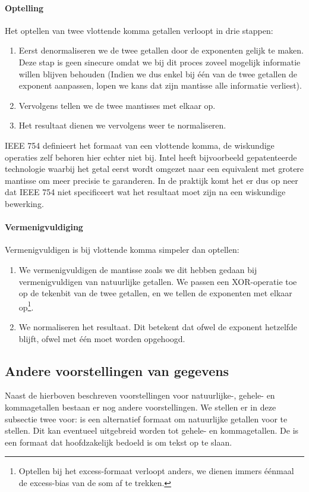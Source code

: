 \paragraph{Optelling}
Het optellen van twee vlottende komma getallen verloopt in drie stappen:
\begin{enumerate}
 \item Eerst denormaliseren we de twee getallen door de exponenten gelijk te maken. Deze stap is geen sinecure omdat we bij dit proces zoveel mogelijk informatie willen blijven behouden (Indien we dus enkel bij \'e\'en van de twee getallen de exponent aanpassen, lopen we kans dat zijn mantisse alle informatie verliest).
 \item Vervolgens tellen we de twee mantisses met elkaar op.
 \item Het resultaat dienen we vervolgens weer te normaliseren.
\end{enumerate}
IEEE 754 definieert het formaat van een vlottende komma, de wiskundige operaties zelf behoren hier echter niet bij. Intel heeft bijvoorbeeld gepatenteerde technologie waarbij het getal eerst wordt omgezet naar een equivalent met grotere mantisse om meer precisie te garanderen. In de praktijk komt het er dus op neer dat IEEE 754 niet specificeert wat het resultaat moet zijn na een wiskundige bewerking.
\paragraph{Vermenigvuldiging}
Vermenigvuldigen is bij vlottende komma simpeler dan optellen:
\begin{enumerate}
 \item We vermenigvuldigen de mantisse zoals we dit hebben gedaan bij vermenigvuldigen van natuurlijke getallen. We passen een XOR-operatie toe op de tekenbit van de twee getallen, en we tellen de exponenten met elkaar op\footnote{Optellen bij het excess-formaat verloopt anders, we dienen immers \'e\'enmaal de excess-bias van de som af te trekken.}.
 \item We normaliseren het resultaat. Dit betekent dat ofwel de exponent hetzelfde blijft, ofwel met \'e\'en moet worden opgehoogd.
\end{enumerate}
\subsection{Andere voorstellingen van gegevens}
\label{ss:otherRepresentations}
Naast de hierboven beschreven voorstellingen voor natuurlijke-, gehele- en kommagetallen bestaan er nog andere voorstellingen. We stellen er in deze subsectie twee voor:  is een alternatief formaat om natuurlijke getallen voor te stellen. Dit kan eventueel uitgebreid worden tot gehele- en kommagetallen. De  is een formaat dat hoofdzakelijk bedoeld is om tekst op te slaan.
